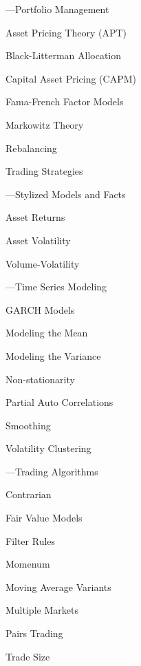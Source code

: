 %
\begin{minipage}{0.40\textwidth}
\noindent ---Portfolio Management 
	\begin{flushright}
	Asset Pricing Theory (APT) \par
	Black-Litterman Allocation \par 
	Capital Asset Pricing (CAPM) \par
	Fama-French Factor Models \par
	Markowitz Theory \par
	Rebalancing \par
	Trading Strategies 
	\end{flushright}


\noindent ---Stylized Models and Facts
	\begin{flushright}
	Asset Returns \par
	Asset Volatility \par
	Volume-Volatility 
	\end{flushright}
	

\noindent ---Time Series Modeling
	\begin{flushright}
	GARCH Models \par
	Modeling the Mean \par
	Modeling the Variance \par
	Non-stationarity \par
	Partial Auto Correlations \par
	Smoothing \par
	Volatility Clustering 
	\end{flushright}


\noindent ---Trading Algorithms
	\begin{flushright}
	Contrarian \par
	Fair Value Models \par
	Filter Rules \par
	Momenum \par
	Moving Average Variants \par
	Multiple Markets \par
	Pairs Trading \par
	Trade Size 
	\end{flushright}
\end{minipage}











	

